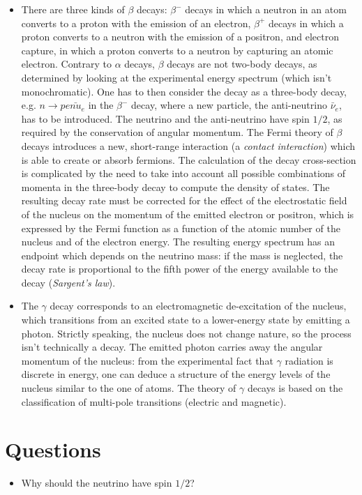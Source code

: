 \begin{itemize}
    \item There are three kinds of $\beta$ decays: $\beta^-$ decays in which a neutron in an atom converts to a proton with the emission of an electron, $\beta^+$ decays in which a proton converts to a neutron with the emission of a positron, and electron capture, in which a proton converts to a neutron by capturing an atomic electron. Contrary to $\alpha$ decays, $\beta$ decays are not two-body decays, as determined by looking at the experimental energy spectrum (which isn't monochromatic). One has to then consider the decay as a three-body decay, e.g. $n\to p e \bar{nu}_e$ in the $\beta^-$ decay, where a new particle, the anti-neutrino $\bar{\nu}_e$, has to be introduced. The neutrino and the anti-neutrino have spin $1/2$, as required by the conservation of angular momentum. The Fermi theory of $\beta$ decays introduces a new, short-range interaction (a \emph{contact interaction}) which is able to create or absorb fermions. The calculation of the decay cross-section is complicated by the need to take into account all possible combinations of momenta in the three-body decay to compute the density of states. The resulting decay rate must be corrected for the effect of the electrostatic field of the nucleus on the momentum of the emitted electron or positron, which is expressed by the Fermi function as a function of the atomic number of the nucleus and of the electron energy. The resulting energy spectrum has an endpoint which depends on the neutrino mass: if the mass is neglected, the decay rate is proportional to the fifth power of the energy available to the decay (\emph{Sargent's law}).
    \item The $\gamma$ decay corresponds to an electromagnetic de-excitation of the nucleus, which transitions from an excited state to a lower-energy state by emitting a photon. Strictly speaking, the nucleus does not change nature, so the process isn't technically a decay. The emitted photon carries away the angular momentum of the nucleus: from the experimental fact that $\gamma$ radiation is discrete in energy, one can deduce a structure of the energy levels of the nucleus similar to the one of atoms. The theory of $\gamma$ decays is based on the classification of multi-pole transitions (electric and magnetic).
\end{itemize}
\section*{Questions}
\begin{itemize}
    \item Why should the neutrino have spin $1/2$?
\end{itemize}
